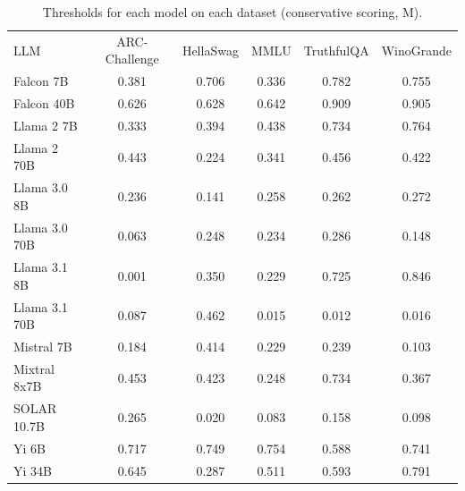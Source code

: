 \begin{table}[h]
\caption{Thresholds for each model on each dataset (conservative scoring, M). }
\label{tab:thresholds_prob_margin_k20_w2}
\centering
\begin{tabular}{l S[table-format=3.1] S[table-format=3.1] S[table-format=3.1] S[table-format=3.1] S[table-format=3.1]}
\toprule
LLM & ARC-Challenge & HellaSwag & MMLU & TruthfulQA & WinoGrande \\ 
\cmidrule(lr){1-1} \cmidrule(lr){2-2} \cmidrule(lr){3-3} \cmidrule(lr){4-4} \cmidrule(lr){5-5} \cmidrule(lr){6-6}
Falcon 7B & 0.381 & 0.706 & 0.336 & 0.782 & 0.755\\
Falcon 40B & 0.626 & 0.628 & 0.642 & 0.909 & 0.905\\
Llama 2 7B & 0.333 & 0.394 & 0.438 & 0.734 & 0.764\\
Llama 2 70B & 0.443 & 0.224 & 0.341 & 0.456 & 0.422\\
Llama 3.0 8B & 0.236 & 0.141 & 0.258 & 0.262 & 0.272\\
Llama 3.0 70B & 0.063 & 0.248 & 0.234 & 0.286 & 0.148\\
Llama 3.1 8B & 0.001 & 0.350 & 0.229 & 0.725 & 0.846\\
Llama 3.1 70B & 0.087 & 0.462 & 0.015 & 0.012 & 0.016\\
Mistral 7B & 0.184 & 0.414 & 0.229 & 0.239 & 0.103\\
Mixtral 8x7B & 0.453 & 0.423 & 0.248 & 0.734 & 0.367\\
SOLAR 10.7B & 0.265 & 0.020 & 0.083 & 0.158 & 0.098\\
Yi 6B & 0.717 & 0.749 & 0.754 & 0.588 & 0.741\\
Yi 34B & 0.645 & 0.287 & 0.511 & 0.593 & 0.791\\
\bottomrule
\end{tabular}
\end{table}
